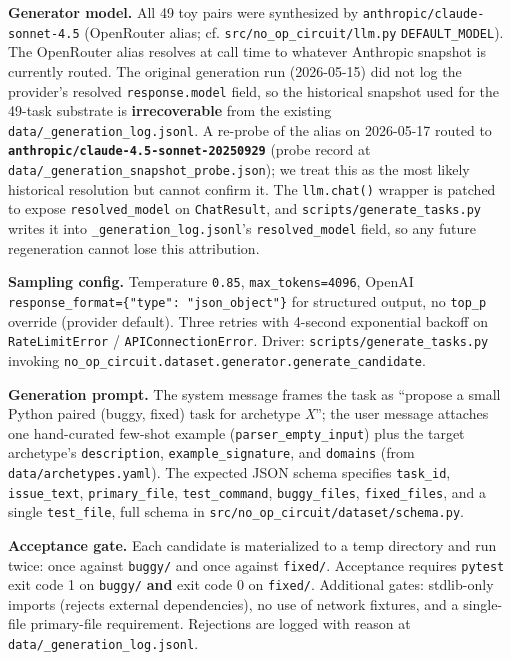 \documentclass[
  11pt,
  a4paper]{article}
\begin{document}
\textbf{Generator model.} All 49 toy pairs were synthesized by
\texttt{anthropic/claude-sonnet-4.5} (OpenRouter alias; cf.
\texttt{src/no\_op\_circuit/llm.py} \texttt{DEFAULT\_MODEL}). The
OpenRouter alias resolves at call time to whatever Anthropic snapshot is
currently routed. The original generation run (2026-05-15) did not log
the provider's resolved \texttt{response.model} field, so the historical
snapshot used for the 49-task substrate is \textbf{irrecoverable} from
the existing \texttt{data/\_generation\_log.jsonl}. A re-probe of the
alias on 2026-05-17 routed to
\textbf{\texttt{anthropic/claude-4.5-sonnet-20250929}} (probe record at
\texttt{data/\_generation\_snapshot\_probe.json}); we treat this as the
most likely historical resolution but cannot confirm it. The
\texttt{llm.chat()} wrapper is patched to expose
\texttt{resolved\_model} on \texttt{ChatResult}, and
\texttt{scripts/generate\_tasks.py} writes it into
\texttt{\_generation\_log.jsonl}'s \texttt{resolved\_model} field, so
any future regeneration cannot lose this attribution.

\textbf{Sampling config.} Temperature \texttt{0.85},
\texttt{max\_tokens=4096}, OpenAI
\texttt{response\_format=\{"type":\ "json\_object"\}} for structured
output, no \texttt{top\_p} override (provider default). Three retries
with 4-second exponential backoff on \texttt{RateLimitError} /
\texttt{APIConnectionError}. Driver: \texttt{scripts/generate\_tasks.py}
invoking \texttt{no\_op\_circuit.dataset.generator.generate\_candidate}.

\textbf{Generation prompt.} The system message frames the task as
``propose a small Python paired (buggy, fixed) task for archetype
\emph{X}''; the user message attaches one hand-curated few-shot example
(\texttt{parser\_empty\_input}) plus the target archetype's
\texttt{description}, \texttt{example\_signature}, and \texttt{domains}
(from \texttt{data/archetypes.yaml}). The expected JSON schema specifies
\texttt{task\_id}, \texttt{issue\_text}, \texttt{primary\_file},
\texttt{test\_command}, \texttt{buggy\_files}, \texttt{fixed\_files},
and a single \texttt{test\_file}, full schema in
\texttt{src/no\_op\_circuit/dataset/schema.py}.

\textbf{Acceptance gate.} Each candidate is materialized to a temp
directory and run twice: once against \texttt{buggy/} and once against
\texttt{fixed/}. Acceptance requires \texttt{pytest} exit code 1 on
\texttt{buggy/} \textbf{and} exit code 0 on \texttt{fixed/}. Additional
gates: stdlib-only imports (rejects external dependencies), no use of
network fixtures, and a single-file primary-file requirement. Rejections
are logged with reason at \texttt{data/\_generation\_log.jsonl}.
\end{document}
